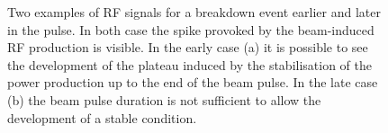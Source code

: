\begin{figure}[h]
\centering
   \hspace{2mm}
\caption{Two examples of RF signals for a breakdown event earlier and later in the pulse. In both case the spike provoked by the beam-induced RF production is visible. In the early case (a) it is possible to see the development of the plateau induced by the stabilisation of the power production up to the end of the beam pulse. In the late case (b) the beam pulse duration is not sufficient to allow the development of a stable condition.}
 \label{BI_rf_fig}
 \end{figure}


